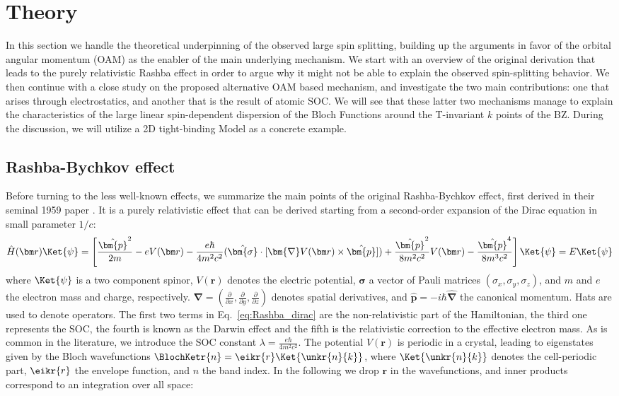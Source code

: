 \section{Theory \label{sec:Rashba_Theory}}
In this section we handle the theoretical underpinning of the observed large spin splitting, building up the arguments in favor of the orbital angular momentum (OAM) as the enabler of the main underlying mechanism.
We start with an overview of the original derivation that leads to the purely relativistic Rashba effect in order to argue why it might not be able to explain the observed spin-splitting behavior.
We then continue with a close study on the proposed alternative OAM based mechanism, and investigate the two main contributions: one that arises through electrostatics, and another that is the result of atomic SOC.
We will see that these latter two mechanisms manage to explain the characteristics of the large linear spin-dependent dispersion of the Bloch Functions around the T-invariant $k$ points of the BZ.
During the discussion, we will utilize a 2D tight-binding Model as a concrete example.

\subsection{Rashba-Bychkov effect \label{sec:Rashba_relativistic}}
Before turning to the less well-known effects, we summarize the main points of the original Rashba-Bychkov effect, first derived in their seminal 1959 paper \cite{Rashba1959SymmetryAr}.
It is a purely relativistic effect that can be derived starting from a second-order expansion of the Dirac equation in small parameter $1/c$:
\begin{equation}
	\label{eq:Rashba_dirac}
	\hat H(\bm r) \Ket{\psi} = \left[\frac{\hat{\bm{p}}^2}{2m} - e V(\bm r) - \frac{e \hbar}{4m^2c^2}(\hat{\bm{\sigma}}\cdot[\bm{\nabla}V(\bm r) \times \hat{\bm{p}}]) + \frac{\hat{\bm{p}}^2}{8m^2c^2} V(\bm r) - \frac{\hat{\bm{p}}^4}{8m^3c^2}\right]\Ket{\psi} = E\Ket{\psi}
\end{equation}
where $\Ket{\psi}$ is a two component spinor, $V(\bm r)$ denotes the electric potential, $\bm{\sigma}$ a vector of Pauli matrices $(\sigma_x, \sigma_y, \sigma_z)$, and $m$ and $e$ the electron mass and charge, respectively.
$\bm \nabla = (\frac{\partial}{\partial x}, \frac{\partial}{\partial y}, \frac{\partial }{\partial z})$ denotes spatial derivatives, and $\hat{\bm{p}} = -i\hbar \hat{\bm{\nabla}}$ the canonical momentum. Hats are used to denote operators.
The first two terms in Eq.~\eqref{eq:Rashba_dirac} are the non-relativistic part of the Hamiltonian, the third one represents the SOC, the fourth is known as the Darwin effect and the fifth is the relativistic correction to the effective electron mass. 
As is common in the literature, we introduce the SOC constant $\lambda = \frac{e \hbar}{4m^2c^2}$.
The potential $V(\bm r)$ is periodic in a crystal, leading to eigenstates given by the Bloch wavefunctions $\BlochKetr{n} = \eikr{r} \Ket{\unkr{n}{k}}$, where $\Ket{\unkr{n}{k}}$ denotes the cell-periodic part, $\eikr{r}$ the envelope function, and $n$ the band index.
In the following we drop $\bm{r}$ in the wavefunctions, and inner products correspond to an integration over all space:

